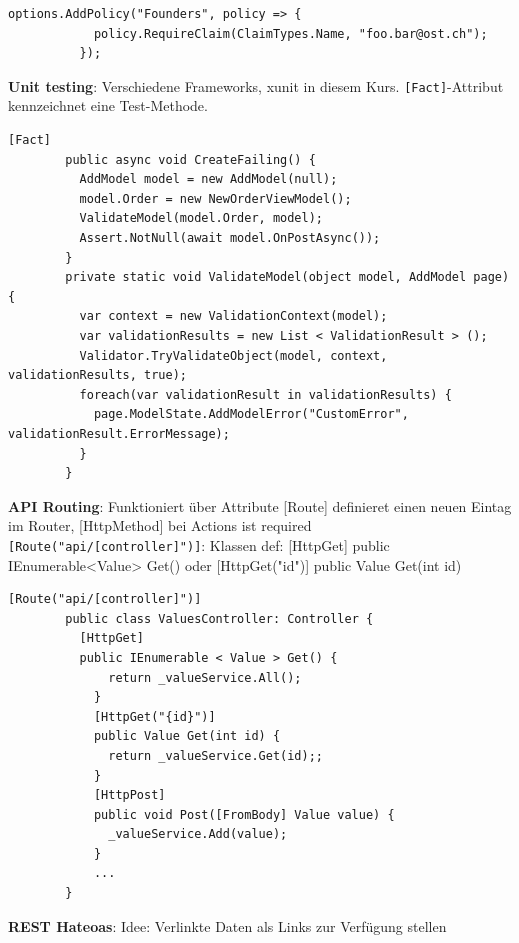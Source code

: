 \documentclass[10pt,landscape]{article}
\begin{document}
\begin{multicols}{2}
        \begin{lstlisting}[style=CSharp]
          options.AddPolicy("Founders", policy => {
            policy.RequireClaim(ClaimTypes.Name, "foo.bar@ost.ch");
          });
        \end{lstlisting}

        \textbf{Unit testing}: Verschiedene Frameworks, xunit in diesem Kurs.
        \lstinline{[Fact]}-Attribut kennzeichnet eine Test-Methode.

        \begin{lstlisting}[style=CSharp]
        [Fact]
        public async void CreateFailing() {
          AddModel model = new AddModel(null);
          model.Order = new NewOrderViewModel();
          ValidateModel(model.Order, model);
          Assert.NotNull(await model.OnPostAsync());
        }
        private static void ValidateModel(object model, AddModel page) {
          var context = new ValidationContext(model);
          var validationResults = new List < ValidationResult > ();
          Validator.TryValidateObject(model, context, validationResults, true);
          foreach(var validationResult in validationResults) {
            page.ModelState.AddModelError("CustomError", validationResult.ErrorMessage);
          }
        }
        \end{lstlisting}

        \textbf{API Routing}: Funktioniert über Attribute [Route] definieret einen neuen Eintag im Router, [HttpMethod] bei Actions ist required
        \lstinline{[Route("api/[controller]")]}: Klassen def: [HttpGet] public IEnumerable<Value> Get()  oder [HttpGet("{id}")] public Value Get(int id)

        \begin{lstlisting}[style=CSharp]
        [Route("api/[controller]")]
        public class ValuesController: Controller {
          [HttpGet]
          public IEnumerable < Value > Get() {
              return _valueService.All();
            }
            [HttpGet("{id}")]
            public Value Get(int id) {
              return _valueService.Get(id);;
            }
            [HttpPost]
            public void Post([FromBody] Value value) {
              _valueService.Add(value);
            }
            ...
        }
        \end{lstlisting}

        \textbf{REST Hateoas}: Idee: Verlinkte Daten als Links zur Verfügung stellen 


\end{multicols}
\end{document}
